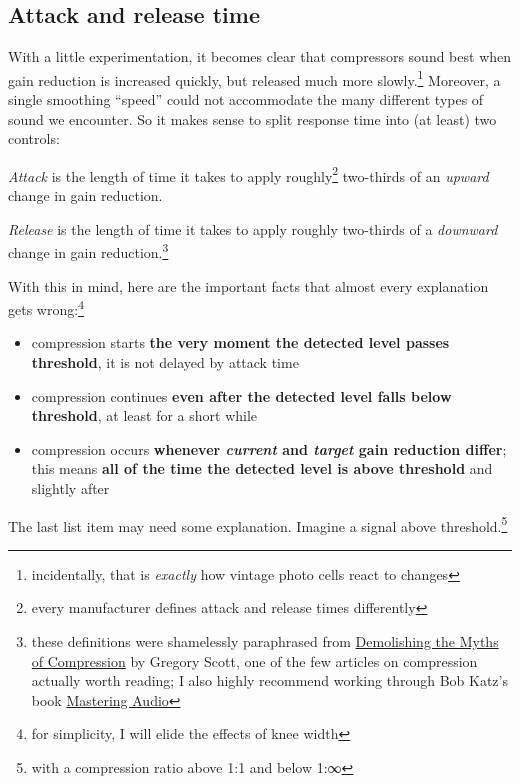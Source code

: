 \subsection{Attack and release time}
\label{sec:attack_and_release_time}

With a little experimentation, it becomes clear that compressors sound
best when gain reduction is increased quickly, but released much more
slowly.\footnote{incidentally, that is \emph{exactly} how vintage
  photo cells react to changes} Moreover, a single smoothing ``speed''
could not accommodate the many different types of sound we encounter.
So it makes sense to split response time into (at least) two controls:

\emph{Attack} is the length of time it takes to apply
roughly\footnote{every manufacturer defines attack and release times
  differently} two-thirds of an \emph{upward} change in gain
reduction.

\emph{Release} is the length of time it takes to apply roughly
two-thirds of a \emph{downward} change in gain
reduction.\footnote{these definitions were shamelessly paraphrased
  from
  \href{https://www.attackmagazine.com/features/columns/gregory-scott-demolishing-the-myths-of-compression/}{Demolishing
    the Myths of Compression} by Gregory Scott, one of the few
  articles on compression actually worth reading; I also highly
  recommend working through Bob Katz's book
  \href{https://www.soundonsound.com/reviews/bob-katz-mastering-audio}{Mastering
    Audio}}

With this in mind, here are the important facts that almost every
explanation gets wrong:\footnote{for simplicity, I will elide the
  effects of knee width}

\begin{itemize}
\item compression starts \textbf{the very moment the detected level
    passes threshold}, it is not delayed by attack time
\item compression continues \textbf{even after the detected level
    falls below threshold}, at least for a short while
\item compression occurs \textbf{whenever \emph{current} and
    \emph{target} gain reduction differ}; this means \textbf{all of
    the time the detected level is above threshold} and slightly after
\end{itemize}

The last list item may need some explanation.  Imagine a signal above
threshold.\footnote{with a compression ratio above 1:1 and below 1:∞}

